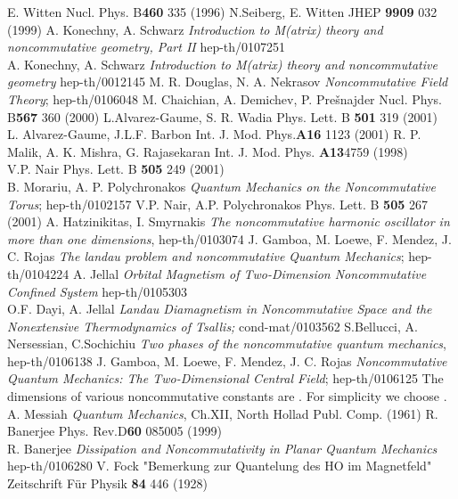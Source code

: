 \documentclass[a4paper,aps,prd,preprint]{revtex4}
\begin{document}
   
\begin{thebibliography}{99}
  E. Witten
Nucl. Phys. B\textbf{460} 335  (1996) 
 N.Seiberg,  E. Witten
JHEP \textbf{9909}  032 (1999)
 A. Konechny, A. Schwarz
 {\it  Introduction to M(atrix) theory and noncommutative geometry, Part II}
  hep-th/0107251\\
 A. Konechny, A. Schwarz
 {\it  Introduction to M(atrix) theory and noncommutative geometry}
  hep-th/0012145
M. R. Douglas, N. A. Nekrasov
 {\it Noncommutative Field Theory};  hep-th/0106048
 M. Chaichian, A. Demichev, P. Pre\v snajder
Nucl. Phys. B\textbf{567 } 360   (2000)
L.Alvarez-Gaume, S. R. Wadia
 Phys. Lett. B \textbf{501} 319 (2001)\\
 L. Alvarez-Gaume, J.L.F. Barbon 
 Int. J. Mod. Phys.\textbf{A16} 1123  (2001) 
  R. P. Malik, A. K. Mishra, G. Rajasekaran
   Int. J. Mod. Phys. \textbf{A13}4759 (1998)\\
  V.P. Nair 
  Phys. Lett. B \textbf{505} 249 (2001) \\
   B. Morariu, A. P. Polychronakos
  {\it Quantum Mechanics on the Noncommutative Torus}; hep-th/0102157
  V.P. Nair, A.P. Polychronakos 
Phys. Lett. B \textbf{505}  267 (2001)
  A. Hatzinikitas, I. Smyrnakis {\it  The noncommutative
 harmonic
oscillator in more than one dimensions}, hep-th/0103074
 J. Gamboa, M. Loewe, F. Mendez, J. C. Rojas
 {\it The landau problem and noncommutative Quantum Mechanics};
 hep-th/0104224
 A. Jellal
{\it Orbital Magnetism of Two-Dimension Noncommutative Confined System}
hep-th/0105303\\
O.F. Dayi, A. Jellal
 {\it Landau Diamagnetism in Noncommutative Space and the Nonextensive 
 Thermodynamics of Tsallis;} cond-mat/0103562 
   S.Bellucci, A. Nersessian, C.Sochichiu 
{\it Two phases of the noncommutative quantum mechanics}, hep-th/0106138
J. Gamboa, M. Loewe, F. Mendez, J. C. Rojas
 {\it Noncommutative Quantum Mechanics: The Two-Dimensional Central Field};
 hep-th/0106125 
 The dimensions  of various noncommutative constants 
are \coordHE{}. For simplicity
we choose \coordHE{}.
 A. Messiah {\it Quantum Mechanics}, Ch.XII, North Hollad
Publ. Comp. (1961)
 R. Banerjee
Phys. Rev.D\textbf{60}   085005  (1999)\\
R. Banerjee
{\it Dissipation and Noncommutativity in Planar Quantum Mechanics}
hep-th/0106280
 V. Fock
"Bemerkung zur Quantelung des HO im Magnetfeld"
Zeitschrift F\"ur Physik  \textbf{84} 446 (1928)
\end{thebibliography}
\end{document}
